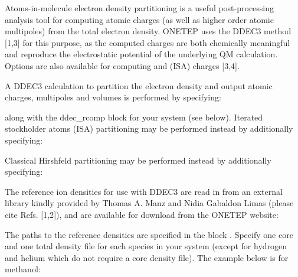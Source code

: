 \documentclass[letterpaper,10pt,english]{sphinxmanual}
\begin{document}
Atoms-in-molecule electron density partitioning is a useful
post-processing analysis tool for computing atomic charges (as well as
higher order atomic multipoles) from the total electron density. ONETEP
uses the DDEC3 method {[}1,3{]} for this purpose, as the computed charges
are both chemically meaningful and reproduce the electrostatic potential
of the underlying QM calculation. Options are also available for
computing  and  (ISA) charges
{[}3,4{]}.

A DDEC3 calculation to partition the electron density and output atomic
charges, multipoles and volumes is performed by specifying:

%
\begin{sphinxVerbatim}[commandchars=\\\{\}]
  
  
  
\end{sphinxVerbatim}

along with the ddec\_rcomp block for your system (see below). Iterated
stockholder atoms (ISA) partitioning may be performed instead by
additionally specifying:

%
\begin{sphinxVerbatim}[commandchars=\\\{\}]
  
\end{sphinxVerbatim}

Classical Hirshfeld partitioning may be performed instead by
additionally specifying:

%
\begin{sphinxVerbatim}[commandchars=\\\{\}]
  
  
  
\end{sphinxVerbatim}

\begin{DUlineblock}{0em}
\item[] The reference ion densities for use with DDEC3 are read in from an
external library kindly provided by Thomas A. Manz and Nidia Gabaldon
Limas (please cite Refs. {[}1,2{]}), and are available for download from
the ONETEP website:
\item[] 
\item[] The paths to the reference densities are specified in the block
. Specify one core and one total density file for each
species in your system (except for hydrogen and helium which do not
require a core density file). The example below is for methanol:
\end{DUlineblock}
\end{document}
